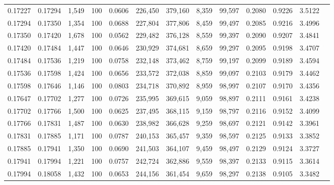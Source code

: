 \begin{tabular}{rrrrrrrrrrrrr}
0.17227 & 0.17294 & 1,549 & 100 &                                     0.0606 & 226,450 & 379,160 &   8,359 &  99,597 & 0.2080 & 0.9226 & 3.5122 \\
0.17294 & 0.17350 & 1,354 & 100 &                                     0.0688 & 227,804 & 377,806 &   8,459 &  99,497 & 0.2085 & 0.9216 & 3.4996 \\
0.17350 & 0.17420 & 1,678 & 100 &                                     0.0562 & 229,482 & 376,128 &   8,559 &  99,397 & 0.2090 & 0.9207 & 3.4841 \\
0.17420 & 0.17484 & 1,447 & 100 &                                     0.0646 & 230,929 & 374,681 &   8,659 &  99,297 & 0.2095 & 0.9198 & 3.4707 \\
0.17484 & 0.17536 & 1,219 & 100 &                                     0.0758 & 232,148 & 373,462 &   8,759 &  99,197 & 0.2099 & 0.9189 & 3.4594 \\
0.17536 & 0.17598 & 1,424 & 100 &                                     0.0656 & 233,572 & 372,038 &   8,859 &  99,097 & 0.2103 & 0.9179 & 3.4462 \\
0.17598 & 0.17646 & 1,146 & 100 &                                     0.0803 & 234,718 & 370,892 &   8,959 &  98,997 & 0.2107 & 0.9170 & 3.4356 \\
0.17647 & 0.17702 & 1,277 & 100 &                                     0.0726 & 235,995 & 369,615 &   9,059 &  98,897 & 0.2111 & 0.9161 & 3.4238 \\
0.17702 & 0.17766 & 1,500 & 100 &                                     0.0625 & 237,495 & 368,115 &   9,159 &  98,797 & 0.2116 & 0.9152 & 3.4099 \\
0.17766 & 0.17831 & 1,487 & 100 &                                     0.0630 & 238,982 & 366,628 &   9,259 &  98,697 & 0.2121 & 0.9142 & 3.3961 \\
0.17831 & 0.17885 & 1,171 & 100 &                                     0.0787 & 240,153 & 365,457 &   9,359 &  98,597 & 0.2125 & 0.9133 & 3.3852 \\
0.17885 & 0.17941 & 1,350 & 100 &                                     0.0690 & 241,503 & 364,107 &   9,459 &  98,497 & 0.2129 & 0.9124 & 3.3727 \\
0.17941 & 0.17994 & 1,221 & 100 &                                     0.0757 & 242,724 & 362,886 &   9,559 &  98,397 & 0.2133 & 0.9115 & 3.3614 \\
0.17994 & 0.18058 & 1,432 & 100 &                                     0.0653 & 244,156 & 361,454 &   9,659 &  98,297 & 0.2138 & 0.9105 & 3.3482 \\

\end{tabular}
